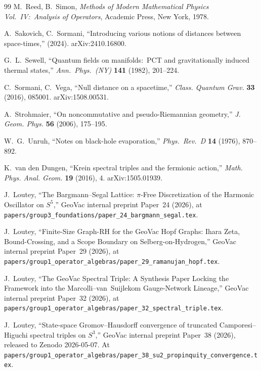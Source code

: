 \documentclass[11pt,a4paper]{article}
\theoremstyle{plain}
\theoremstyle{definition}
\begin{document}
\begin{thebibliography}{99}
M.~Reed, B.~Simon, \emph{Methods of Modern Mathematical Physics
Vol.~IV:\ Analysis of Operators}, Academic Press, New York, 1978.

A.~Sakovich, C.~Sormani, ``Introducing various notions of distances
between space-times,'' (2024). arXiv:2410.16800.

G.~L.~Sewell, ``Quantum fields on manifolds:\ PCT and gravitationally
induced thermal states,'' \emph{Ann.~Phys.~(NY)} \textbf{141} (1982),
201--224.

C.~Sormani, C.~Vega, ``Null distance on a spacetime,''
\emph{Class. Quantum Grav.} \textbf{33} (2016), 085001. arXiv:1508.00531.

A.~Strohmaier, ``On noncommutative and pseudo-Riemannian geometry,''
\emph{J. Geom. Phys.} \textbf{56} (2006), 175--195.

W.~G.~Unruh, ``Notes on black-hole evaporation,'' \emph{Phys.~Rev.~D}
\textbf{14} (1976), 870--892.

K.~van den Dungen, ``Krein spectral triples and the fermionic action,''
\emph{Math. Phys. Anal. Geom.} \textbf{19} (2016), 4. arXiv:1505.01939.


J.~Loutey, ``The Bargmann--Segal Lattice: $\pi$-Free Discretization
of the Harmonic Oscillator on $S^5$,'' GeoVac internal preprint Paper~24
(2026), at
\texttt{papers/group3\_foundations/paper\_24\_bargmann\_segal.tex}.

J.~Loutey, ``Finite-Size Graph-RH for the GeoVac Hopf Graphs: Ihara Zeta, Bound-Crossing, and a Scope Boundary on Selberg-on-Hydrogen,'' GeoVac internal preprint
Paper~29 (2026), at
\texttt{papers/group1\_operator\_algebras/paper\_29\_ramanujan\_hopf.tex}.

J.~Loutey, ``The GeoVac Spectral Triple: A Synthesis Paper Locking the
Framework into the Marcolli--van~Suijlekom Gauge-Network Lineage,'' GeoVac internal preprint
Paper~32 (2026), at
\texttt{papers/group1\_operator\_algebras/paper\_32\_spectral\_triple.tex}.

J.~Loutey, ``State-space Gromov--Hausdorff convergence of truncated
Camporesi--Higuchi spectral triples on $S^3$,'' GeoVac internal preprint Paper~38 (2026),
released to Zenodo 2026-05-07. At
\texttt{papers/group1\_operator\_algebras/paper\_38\_su2\_propinquity\_convergence.tex}.


\end{thebibliography}
\end{document}
